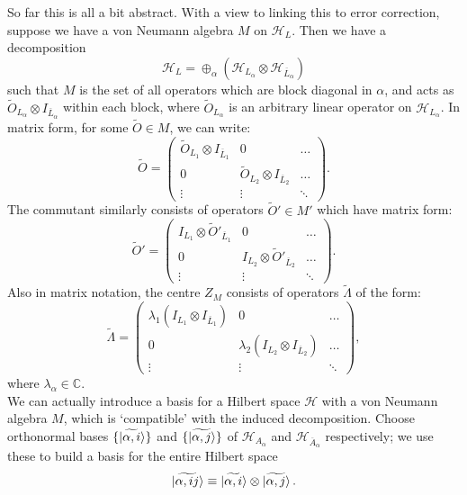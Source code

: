 \documentclass[12pt,a4paper]{report}
\numberwithin{equation}{section}
\newcommand{\ol}[1]{\overline{#1}}
\theoremstyle{definition}
\theoremstyle{theorem}
\theoremstyle{theorem}
\theoremstyle{example}
\theoremstyle{definition}
\begin{document}
So far this is all a bit abstract. With a view to linking this to error correction, suppose we have a von Neumann algebra $M$ on $\mathcal{H}_{L}$. Then we have a decomposition
\begin{equation}\label{decomp}
	\mathcal{H}_{L}=\oplus_{\alpha}(\mathcal{H}_{L_{\alpha}}\otimes\mathcal{H}_{\ol{L}_{\alpha}})
\end{equation} 
such that $M$ is the set of all operators which are block diagonal in $\alpha$, and acts as $\tilde{O}_{L_{\alpha}}\otimes I_{\ol{L}_{\alpha}}$ within each block, where $\tilde{O}_{L_{\alpha}}$ is an arbitrary linear operator on $\mathcal{H}_{L_{\alpha}}$. In matrix form, for some $\tilde{O}\in M$, we can write:
\begin{equation}\label{thing1}
	\tilde{O}=\begin{pmatrix}
		\tilde{O}_{L_{1}}\otimes I_{\ol{L}_{1}}&0&\dots\\
		0&\tilde{O}_{L_{2}}\otimes I_{\ol{L}_{2}}&\dots\\
		\vdots&\vdots&\ddots
	\end{pmatrix}.
\end{equation}
The commutant similarly consists of operators $\tilde{O}'\in M'$ which have matrix form:
\begin{equation}
	\tilde{O}'=\begin{pmatrix}
		I_{L_{1}}\otimes\tilde{O}'_{\ol{L}_{1}}&0&\dots\\
		0&I_{L_{2}}\otimes\tilde{O}'_{\ol{L}_{2}}&\dots\\
		\vdots&\vdots&\ddots
	\end{pmatrix}.
\end{equation}
Also in matrix notation, the centre $Z_{M}$ consists of operators $\tilde{\Lambda}$ of the form:
\begin{equation}
	\tilde{\Lambda}=\begin{pmatrix}
		\lambda_{1}(I_{L_{1}}\otimes I_{\ol{L}_{1}})&0&\dots\\
		0&\lambda_{2}(I_{L_{2}}\otimes I_{\ol{L}_{2}})&\dots\\
		\vdots&\vdots&\ddots
	\end{pmatrix},
\end{equation}
where $\lambda_{\alpha}\in\mathbb{C}$.\\
We can actually introduce a basis for a Hilbert space $\mathcal{H}$ with a von Neumann algebra $M$, which is `compatible' with the induced decomposition. Choose orthonormal bases $\{\ket{\widetilde{\alpha,i}}\}$ and $\{\ket{\widetilde{\alpha,j}}\}$ of $\mathcal{H}_{A_{\alpha}}$ and $\mathcal{H}_{\ol{A}_{\alpha}}$ respectively; we use these to build a basis for the entire Hilbert space
\begin{equation}\label{basis}
	\ket{\widetilde{\alpha,ij}}\equiv\ket{\widetilde{\alpha,i}}\otimes\ket{\widetilde{\alpha,j}}.
\end{equation}
\end{document}
